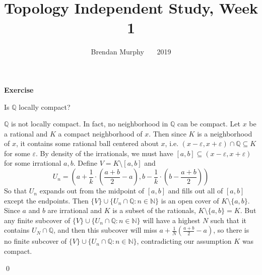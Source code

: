 \documentclass[12pt]{article}
\newcommand{\qcolor}{Gray}
\newcommand{\acolor}{Black}
\newcommand{\N}{\mathbb{N}}
\newcommand{\Q}{\mathbb{Q}}
\newcommand{\question}[1]{
	\color{\qcolor} 
	\item[#1~]}
\newcommand{\answer}[0]{
	\color{\acolor} 
	\item[]}
\newenvironment{exercise}[1]
{
	{
		\Large
		\color{\acolor}
		\addtolength\leftskip{-2em}
		\textbf{Exercise #1}
		
	}
	\begin{list}{}
	{
		\setlength\leftmargin{1em}
		\setlength\rightmargin{0em}
		\setlength\labelwidth{2em}
		\setlength\itemsep{0em}
		\setlength\parsep{0.5em}
		\setlength\baselineskip{1.25em}
	}
}
{
  \qed{}
  \end{list}
}
\begin{document}
\title{\Huge Topology Independent Study, Week 1}
\author{Brendan Murphy \ \textemdash\ \ 2019}
\date{\vspace{-7ex}}

\posttitle{\par\end{center}}\maketitle

\begin{exercise}{1}
  \question{} Is $\Q$ locally compact?
  \answer
  $\Q$ is not locally compact. In fact, no neighborhood in $\Q$ can be compact. Let $x$ be a rational and $K$ a compact neighborhood of $x$. Then since $K$ is a neighborhood of $x$, it contains some rational ball centered about $x$, i.e. $(x-\varepsilon, x+\varepsilon) \cap \Q \subseteq K$ for some $\varepsilon$. By density of the irrationals, we must have $[a, b] \subseteq (x - \varepsilon, x + \varepsilon)$ for some irrational $a, b$. Define $V = K\setminus [a, b]$ and
  $$U_n = \left(a + \frac{1}{k}\cdot \left(\frac{a+b}{2} - a\right), b - \frac{1}{k}\cdot \left(b - \frac{a+b}{2}\right)\right)$$
  So that $U_n$ expands out from the midpoint of $[a, b]$ and fills out all of $[a, b]$ except the endpoints. Then $\{V\} \cup \{ U_n \cap \Q : n \in \N \}$ is an open cover of $K \setminus \{a,b\}$. Since $a$ and $b$ are irrational and $K$ is a subset of the rationals, $K \setminus \{a,b\} = K$. But any finite subcover of $\{V\} \cup \{ U_n \cap \Q : n \in \N \}$ will have a highest $N$ such that it contains $U_N \cap \Q$, and then this subcover will miss $a + \frac{1}{N}\left(\frac{a+b}{2} - a\right)$, so there is no finite subcover of $\{V\} \cup \{ U_n \cap \Q : n \in \N \}$, contradicting our assumption $K$ was compact.
\end{exercise}
\end{document}
